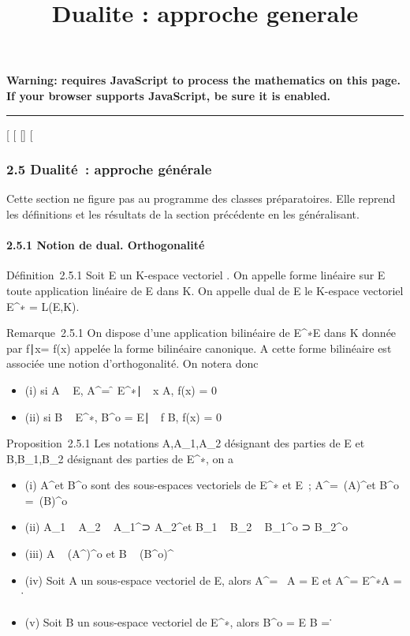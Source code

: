 \documentclass[]{article}
\title{Dualite : approche generale}
\author{}
\date{}
\begin{document}
\maketitle

\textbf{Warning: 
requires JavaScript to process the mathematics on this page.\\ If your
browser supports JavaScript, be sure it is enabled.}

\begin{center}\rule{3in}{0.4pt}\end{center}

{[}
{[}
{[}{]}
{[}

\subsubsection{2.5 Dualité~: approche générale}

Cette section ne figure pas au programme des classes préparatoires. Elle
reprend les définitions et les résultats de la section précédente en les
généralisant.

\paragraph{2.5.1 Notion de dual. Orthogonalité}

Définition~2.5.1 Soit E un K-espace vectoriel . On appelle forme
linéaire sur E toute application linéaire de E dans K. On appelle dual
de E le K-espace vectoriel E^∗ = L(E,K).

Remarque~2.5.1 On dispose d'une application bilinéaire de
E^∗\times E dans K donnée par \langle
f∣x\rangle = f(x) appelée la
forme bilinéaire canonique. A cette forme bilinéaire est associée une
notion d'orthogonalité. On notera donc

\begin{itemize}
\itemsep1pt\parskip0pt
\item
  (i) si A \subset~ E, A^\bot = \f \in
  E^∗∣\forall~~x
  \in A, f(x) = 0\
\item
  (ii) si B \subset~ E^∗, B^o = \x \in
  E∣\forall~~f \in B, f(x) =
  0\
\end{itemize}

Proposition~2.5.1 Les notations A,A_1,A_2 désignant
des parties de E et B,B_1,B_2 désignant des parties de
E^∗, on a

\begin{itemize}
\itemsep1pt\parskip0pt
\item
  (i) A^\bot et B^o sont des sous-espaces vectoriels
  de E^∗ et E~; A^\bot =\
  \mathrmVect(A)^\bot et B^o
  =\
  \mathrmVect(B)^o
\item
  (ii) A_1 \subset~ A_2 \rigtharrow~ A_1^\bot⊃
  A_2^\bot et B_1 \subset~ B_2 \rigtharrow~
  B_1^o ⊃ B_2^o
\item
  (iii) A \subset~ (A^\bot)^o et B \subset~
  (B^o)^\bot
\item
  (iv) Soit A un sous-espace vectoriel de E, alors A^\bot =
  \0\ \Leftrightarrow A =
  E et A^\bot = E^∗\Leftrightarrow A =
  \0\.
\item
  (v) Soit B un sous-espace vectoriel de E^∗, alors
  B^o = E \Leftrightarrow B =
  \0\.
\end{itemize}
\end{document}
